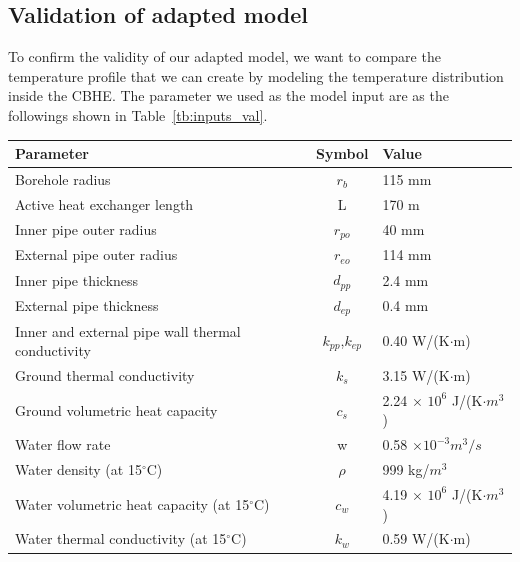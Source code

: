 \subsection{Validation of adapted model}
	To confirm the validity of our adapted model, we want to compare the temperature profile that we can create by modeling the temperature distribution inside the CBHE. The parameter we used as the model input are as the followings shown in Table~\ref{tb:inputs_val}. 
	
	\begin{table}[h!]
            \begin{center}
            \tabcolsep=0.11cm
            \begin{tabular}{lcl}
                \hline
                Parameter & Symbol & Value\\
                \hline
                Borehole radius & $r_{b}$ & 115 mm\\
                Active heat exchanger length & L & 170 m\\
                Inner pipe outer radius & $r_{po}$ & 40 mm\\
                External pipe outer radius & $r_{eo}$ & 114 mm\\
                Inner pipe thickness & $d_{pp}$ & 2.4 mm\\
                External pipe thickness & $d_{ep}$ & 0.4 mm\\
                Inner and external pipe wall thermal conductivity & $k_{pp}$,$k_{ep}$ & 0.40 W/(K$\cdot$m)\\
                Ground thermal conductivity & $k_{s}$ & 3.15 W/(K$\cdot$m)\\
                Ground volumetric heat capacity & $c_{s}$ & 2.24 $\times$ $10^6$ J/(K$\cdot$$m^3$)\\
                Water flow rate & w & 0.58 $\times 10^{-3}m^3/s$\\
                Water density (at 15$^{\circ}$C) & $\rho$ & 999 kg/$m^3$\\
                Water volumetric heat capacity (at 15$^{\circ}$C) & $c_{w}$ & 4.19 $\times$ $10^6$ J/(K$\cdot$$m^3$)\\
                Water thermal conductivity (at 15$^{\circ}$C) & $k_{w}$ & 0.59 W/(K$\cdot$m)\\

\end{tabular}
\end{center}
\end{table}
